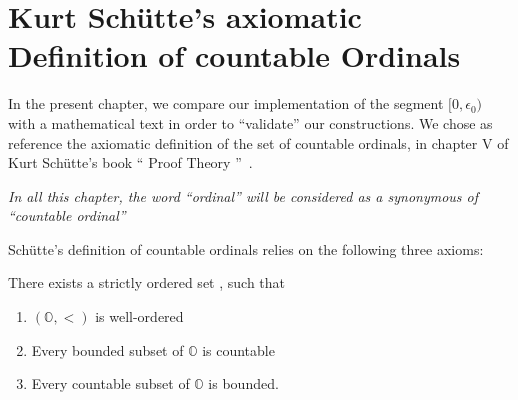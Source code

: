 \documentclass[a4paper]{book}
\begin{document}











\chapter[Countable Ordinals (after Sch\"{u}tte)]{Kurt Schütte's axiomatic Definition of countable Ordinals}

\label{chap:schutte} 

In the present chapter, we  compare our implementation of the segment $[0,\epsilon_0)$ with a mathematical text in order to ``validate'' our constructions.
We chose as reference the axiomatic definition of the set of countable ordinals,
in chapter V of Kurt Schütte's book `` Proof Theory ''~\cite{schutte}.

\begin{remark}
\emph{In all this chapter, the word ``ordinal'' will be considered as a synonymous of
``countable ordinal''}  
\end{remark}



Schütte's definition of countable ordinals relies on the following three axioms:

There  exists a strictly ordered set , such that
\begin{enumerate}
\item  $(\mathbb{O},<)$ is well-ordered
\item Every bounded subset of $\mathbb{O}$  is countable
\item Every countable subset of $\mathbb{O}$  is bounded.
\end{enumerate}
\end{document}

